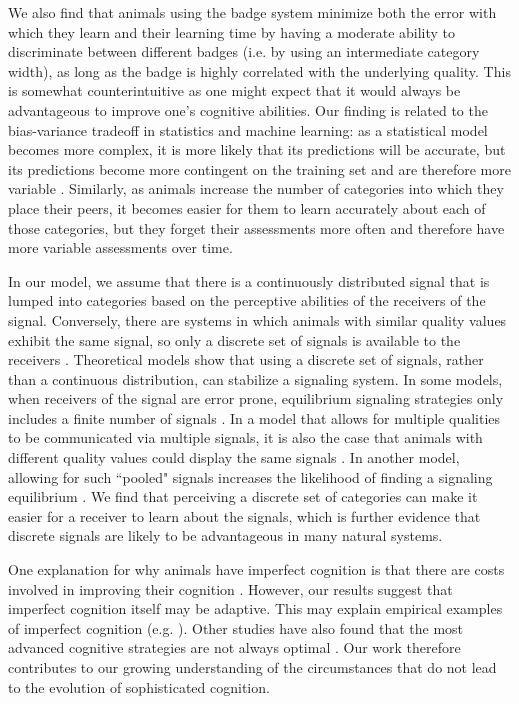 We also find that animals using the badge system minimize both the error with which they learn and their learning time by having a moderate ability to discriminate between different badges (i.e. by using an intermediate category width), as long as the badge is highly correlated with the underlying quality. This is somewhat counterintuitive as one might expect that it would always be advantageous to improve one's cognitive abilities. Our finding is related to the bias-variance tradeoff in statistics and machine learning: as a statistical model becomes more complex, it is more likely that its predictions will be accurate, but its predictions become more contingent on the training set and are therefore more variable \citep{Domingos:2000cr,Briscoe:2011nx}. Similarly, as animals increase the number of categories into which they place their peers, it becomes easier for them to learn accurately about each of those categories, but they forget their assessments more often and therefore have more variable assessments over time. %

In our model, we assume that there is a continuously distributed signal that is lumped into categories based on the perceptive abilities of the receivers of the signal. Conversely, there are systems in which animals with similar quality values exhibit the same signal, so only a discrete set of signals is available to the receivers \citep{Johnstone:1994uq}. Theoretical models show that using a discrete set of signals, rather than a continuous distribution, can stabilize a signaling system. In some models, when receivers of the signal are error prone, equilibrium signaling strategies only includes a finite number of signals \citep{Grafen:1993kx,Johnstone:1994uq}. In a model that allows for multiple qualities to be communicated via multiple signals, it is also the case that animals with different quality values could display the same signals \citep{Johnstone:1995vn}. In another model, allowing for such ``pooled" signals increases the likelihood of finding a signaling equilibrium \citep{Lachmann:1998fk}. We find that perceiving a discrete set of categories can make it easier for a receiver to learn about the signals, which is further evidence that discrete signals are likely to be advantageous in many natural systems.

One explanation for why animals have imperfect cognition is that there are costs involved in improving their cognition \citep{Dunbar:1992ys,Laughlin:1998ly,Laughlin:2001qf,Gavrilets:2006fk,MacIver:2010ve}. However, our results suggest that imperfect cognition itself may be adaptive. This may explain empirical examples of imperfect cognition (e.g. \citep{Kikuchi:2010ys}).
Other studies have also found that the most advanced cognitive strategies are not always optimal \citep{Stephens:1991fk,Kerr:2003vn,Dunlap:2009vn}. Our work therefore contributes to our growing understanding of the circumstances that do not lead to the evolution of sophisticated cognition.

